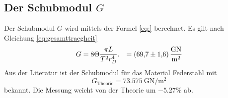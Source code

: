 \subsection{Der Schubmodul \texorpdfstring{$G$}{G}}
Der Schubmodul $G$ wird mittels der Formel \eqref{eq:} berechnet.
Es gilt nach Gleichung \eqref{eq:gesamttraegheit}
\begin{align}
	G 	&=  8 \Theta\frac{\pi L}{T^2 r_D^4}.%
		&=	\SI{69.7\pm1.6}{\giga\newton\per\meter\squared}
	\label{eq:schubmodul}
	\end{align}
Aus der Literatur ist der Schubmodul für das Material Federstahl mit
\begin{equation}
	G_\text{Theorie} = \SI{73.575}{\giga\newton\per\meter\squared}
\end{equation}bekannt.
Die Messung weicht von der Theorie um $-5.27\%$ ab.

